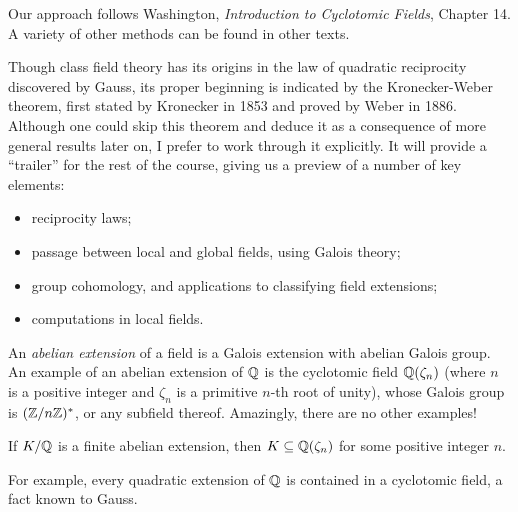 %
%
%
%

%
%
%
 Our approach follows
Washington, \textit{Introduction to Cyclotomic Fields}, Chapter 14.
A variety of other methods can be found in other texts.


Though class field theory has its origins in the law of quadratic 
reciprocity discovered by Gauss, its proper beginning is indicated by the
Kronecker-Weber theorem, first stated by Kronecker in 1853 and proved by
Weber in 1886. Although one could skip this theorem and deduce it as a
consequence of more general results later on, I prefer to work through
it explicitly. It will provide a ``trailer'' for the rest of the course,
giving us a preview of a number of key elements:
\begin{itemize}
\item reciprocity laws;
\item passage between local and global fields, using Galois theory;
\item group cohomology, and applications to classifying field extensions;
\item computations in local fields.
\end{itemize}

An \emph{abelian extension} of a field is a Galois extension with abelian 
Galois group. An example of an abelian extension of $\mathbb{Q}$ is the cyclotomic
field $\mathbb{Q}(\zeta_n)$ (where $n$ is a positive integer and $\zeta_n$ is a primitive $n$-th root of 
unity), whose Galois group is $(\mathbb{Z}/n\mathbb{Z})^*$, or any
subfield thereof. Amazingly, there are no other examples!
\begin{theorem} \label{T:Kronecker-Weber}
If $K/\mathbb{Q}$ is a finite abelian extension, then
$K \subseteq \mathbb{Q}(\zeta_n)$ for some positive integer $n$.
\end{theorem}
For example, every quadratic extension of $\mathbb{Q}$ is contained in a cyclotomic
field, a fact known to Gauss.

